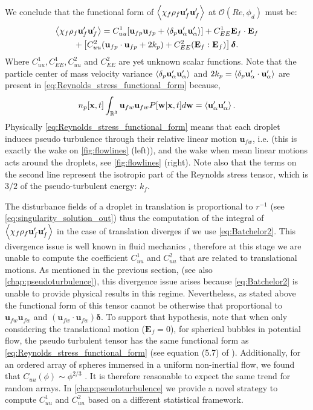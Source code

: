 We conclude that the functional form of $\left<\chi_f \rho_f \textbf{u}_f' \textbf{u}_f'\right>$ at $\mathcal{O}(Re,\phi_d)$ must be:
\begin{multline}
    \avg{\chi_f \rho_f \textbf{u}_f' \textbf{u}_f'}
    =
    C_{uu}^1 [\textbf{u}_{fp} \textbf{u}_{fp}+ \pavg{\textbf{u}_\alpha' \textbf{u}_\alpha'}]
    + C_{EE}^1 \textbf{E}_f\cdot \textbf{E}_f \\
    + \left[ 
        C_{uu}^2 (\textbf{u}_{fp}\cdot  \textbf{u}_{fp} + 2k_p)
        +  C_{EE}^2 (\textbf{E}_f : \textbf{E}_f)
    \right]\bm\delta.
    \label{eq:Reynolds_stress_functional_form}
\end{multline}
Where $C_{uu}^1,C_{EE}^1,C_{uu}^2$ and $C_{EE}^2$ are yet unknown scalar functions. 
Note that the particle center of mass velocity variance $\left<\delta_p \textbf{u}_\alpha' \textbf{u}_\alpha'\right>$ and $2k_p = \left<\delta_p \textbf{u}_\alpha' \cdot \textbf{u}_\alpha'\right>$ are present in \ref{eq:Reynolds_stress_functional_form} because, 
\begin{equation}
    n_p[\textbf{x},t]\int_{\mathbb{R}^3} \textbf{u}_{fw}\textbf{u}_{fw} P[\textbf{w}|\textbf{x},t] d\textbf{w}
    =  
    \left<\textbf{u}_\alpha'\textbf{u}_\alpha'\right>. 
\end{equation}
Physically \ref{eq:Reynolds_stress_functional_form} means that each droplet induces pseudo turbulence through their relative linear motion $\textbf{u}_{fw}$, i.e. (this is exactly the wake on \ref{fig:flowlines} (left)), and the wake when mean linear motions acts around the droplets, see  \ref{fig:flowlines} (right). 
Note also that the terms on the second line represent the isotropic part of the Reynolds stress tensor,  which is $3/2$ of the pseudo-turbulent energy: $k_f$. 


The disturbance fields of a droplet in translation is proportional to $r^{-1}$ (see \ref{eq:singularity_solution_out}) thus the computation of the integral of $\left<\chi_f \rho_f \textbf{u}_f' \textbf{u}_f'\right>$ in the case of translation diverges if we use \ref{eq:Batchelor2}.
This divergence issue is well known in fluid mechanics \citep{caflisch1985variance}, therefore at this stage we are unable to compute the coefficient $C_{uu}^1$ and $C_{uu}^2$ that are related to translational motions. 
As mentioned in the previous section, (see also \ref{chap:pseudoturbulence}), this divergence issue arises because \ref{eq:Batchelor2} is unable to provide physical results in this regime. 
Nevertheless, as stated above the functional form of this tensor cannot be otherwise that proportional to $\textbf{u}_{fw} \textbf{u}_{fw}$ and $(\textbf{u}_{fw}\cdot \textbf{u}_{fw})\bm\delta$.
To support that hypothesis, note that when only considering the translational motion ($\textbf{E}_f = 0$), for spherical bubbles in potential flow, the pseudo turbulent tensor has the same functional form as \ref{eq:Reynolds_stress_functional_form} (see equation (5.7) of \citet{zhang1994ensemble}). 
Additionally, for an ordered array of spheres immersed in a uniform non-inertial flow, we found that $C_{uu}(\phi) \sim \phi^{2/3}$ \citet{hill2001first}.
It is therefore reasonable to expect the same trend for random arrays.
In \ref{chap:pseudoturbulence} we provide a novel strategy to compute $C_{uu}^1$ and $C_{uu}^2$ based on a different statistical framework. 


